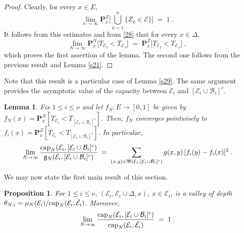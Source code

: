 \documentclass[reqno]{amsart}
\newtheorem{lemma}[theorem]{Lemma}
\newtheorem{proposition}[theorem]{Proposition}
\begin{document}
\begin{proof}
Clearly, for every $x\in E$,
\begin{equation*}
\lim_{n\to\infty} {{\mathbf P}}^Z_x \Big[ \bigcup_{k=1}^n \{Z_k \in {{\mathcal E}}\}
\Big] \;=\; 1\;.
\end{equation*}
It follows from this estimates and from \eqref{28} that 
for every $x \in \Delta$,
\begin{equation*}
\lim_{N\to\infty} {{\mathbf P}}_x^N \big[ T_{{{\mathcal E}}_I} < T_{{{\mathcal E}}_J} \big]
\;=\; {{\mathbf P}}_x^Z \big[ T_{{{\mathcal E}}_I} < T_{{{\mathcal E}}_J} \big]\;,
\end{equation*}
which proves the first assertion of the lemma. The second one follows
from the previous result and Lemma \ref{s21}.
\end{proof}

Note that this result is a particular case of Lemma \ref{s29}.  The
same argument provides the asymptotic value of the capacity between
${{\mathcal E}}_i$ and $[{{\mathcal E}}_i \cup {{\mathcal B}}_i]^c$.

\begin{lemma}
\label{s23}
Fix $1\le i\le \nu$ and let $f_N:E\to [0,1]$ be given by $f_N(x) = {{\mathbf P}}^N_x [T_{{{\mathcal E}}_i} < T_{[{{\mathcal E}}_i \cup {{\mathcal B}}_i]^c}]$. Then, $f_N$
converges pointwisely to $f_i (x) = {{\mathbf P}}^Z_x [T_{{{\mathcal E}}_i} < T_{[{{\mathcal E}}_i
  \cup {{\mathcal B}}_i]^c}]$. In particular,
\begin{equation*}
\lim_{N\to\infty} \frac {{{\rm cap}}_N({{\mathcal E}}_i, [{{\mathcal E}}_i \cup {{\mathcal B}}_i]^c)}
{{{\mathfrak g}}_N({{\mathcal E}}_i, [{{\mathcal E}}_i \cup {{\mathcal B}}_i]^c)}  \;=\; 
\sum_{(x,y) \in {{\mathfrak B}}({{\mathcal E}}_i, [{{\mathcal E}}_i \cup {{\mathcal B}}_i]^c)} g(x,y) 
\, [f_i (y) - f_i (x)]^2 \;.
\end{equation*}
\end{lemma}

We may now state the first main result of this section.

\begin{proposition}
\label{s30}
For $1\le i\le \nu$, $({{\mathcal E}}_i, {{\mathcal E}}_i \cup \Delta, x)$, $x\in {{\mathcal E}}_i$, is a valley of depth $\theta_{N,i} = \mu_N({{\mathcal E}}_i)/{{\rm cap}}_N({{\mathcal E}}_i, \breve{{{\mathcal E}}_i})$. Moreover,
\begin{equation*}
\lim_{N\to\infty} \frac {{{\rm cap}}_N({{\mathcal E}}_i, [{{\mathcal E}}_i \cup {{\mathcal B}}_i]^c)}
{{{\rm cap}}_N({{\mathcal E}}_i, \breve{{{\mathcal E}}_i})}  \;=\; 1\;.
\end{equation*}
\end{proposition}
\end{document}
